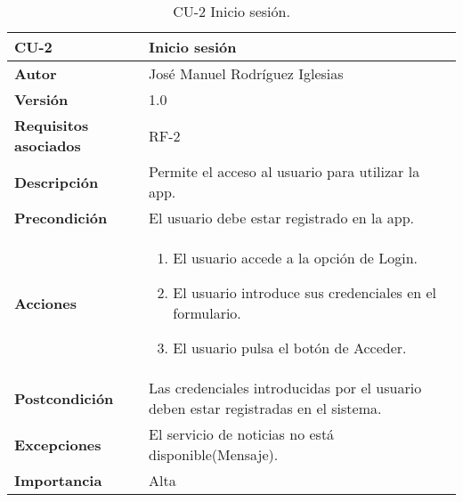 \begin{table}[h]
	\centering
	\begin{tabularx}{\linewidth}{ p{} p{} }
		\toprule
		\textbf{CU-2}    & \textbf{Inicio sesión}\\
		\toprule
            \textbf{Autor}                & José Manuel Rodríguez Iglesias \\
		\textbf{Versión}              & 1.0    \\
		\textbf{Requisitos asociados} & RF-2 \\
		\textbf{Descripción}          & Permite el acceso al usuario para utilizar la app. \\
		\textbf{Precondición}         & El usuario debe estar registrado en la app. \\
		\textbf{Acciones}             &
		\begin{enumerate}
			\def\labelenumi{\arabic{enumi}.}
			\tightlist
			\item El usuario accede a la opción de Login.
			\item El usuario introduce sus credenciales en el formulario.
			\item El usuario pulsa el botón de Acceder.
		\end{enumerate}\\
		\textbf{Postcondición}        & Las credenciales introducidas por el usuario deben estar registradas en el sistema. \\
		\textbf{Excepciones}          & El servicio de noticias no está disponible(Mensaje). \\
		\textbf{Importancia}          & Alta\\
		\bottomrule
	\end{tabularx}
	\caption{CU-2 Inicio sesión.}
\end{table}

